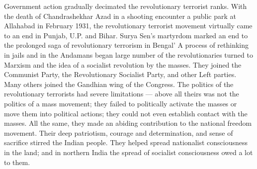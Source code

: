 Government action gradually decimated the revolutionary terrorist ranks. With the death of Chandrashekhar Azad in a shooting encounter a public park at Allahabad in February 1931, the revolutionary terrorist movement virtually came to an end in Punjab, U.P. and Bihar. Surya Sen's martyrdom marked an end to the prolonged saga of revolutionary terrorism in Bengal' A process of rethinking in jails and in the Andamans began large number of the revolutionaries turned to Marxism and the idea of a socialist revolution by the masses. They joined the Communist Party, the Revolutionary Socialist Party, and other Left parties. Many others joined the Gandhian wing of the Congress. The politics of the revolutionary terrorists had severe limitations — above all theirs was not the politics of a mass movement; they failed to politically activate the masses or move them into political actions; they could not even establish contact with the masses. All the same, they made an abiding contribution to the national freedom movement. Their deep patriotism, courage and determination, and sense of sacrifice stirred the Indian people. They helped spread nationalist consciousness in the land; and in northern India the spread of socialist consciousness owed a lot to them.

